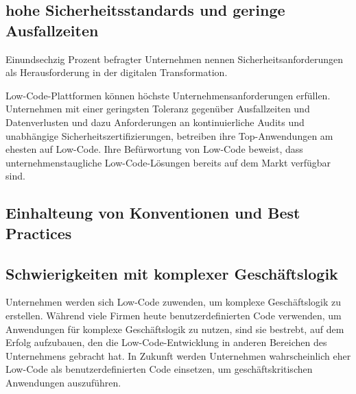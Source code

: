 \documentclass[12pt]{article} %
\begin{document}
	\subsection{hohe Sicherheitsstandards und geringe Ausfallzeiten} 
	Einundsechzig Prozent befragter Unternehmen nennen Sicherheitsanforderungen als Herausforderung in der digitalen Transformation. \cite{EmmaVanPelt.2019} %
	
	Low-Code-Plattformen können höchste Unternehmensanforderungen erfüllen. Unternehmen mit einer geringsten Toleranz gegenüber Ausfallzeiten und Datenverlusten und dazu Anforderungen an kontinuierliche Audits und unabhängige Sicherheitszertifizierungen, betreiben ihre Top-Anwendungen am ehesten auf Low-Code. Ihre Befürwortung von Low-Code beweist, dass unternehmenstaugliche Low-Code-Lösungen bereits auf dem Markt verfügbar sind. \cite{EmmaVanPelt.2019}
	
	
	
	
	
	\subsection{Einhalteung von Konventionen und Best Practices}
	
	\subsection{Schwierigkeiten mit komplexer Geschäftslogik}
	Unternehmen werden sich Low-Code zuwenden, um komplexe Geschäftslogik zu erstellen.
	Während viele Firmen heute benutzerdefinierten Code verwenden, um Anwendungen für komplexe
	Geschäftslogik zu nutzen, sind sie bestrebt, auf dem Erfolg aufzubauen, den die Low-Code-Entwicklung in anderen Bereichen des Unternehmens gebracht hat. In Zukunft werden Unternehmen wahrscheinlich eher Low-Code als benutzerdefinierten Code einsetzen, um geschäftskritischen Anwendungen auszuführen. \cite{EmmaVanPelt.2019}
	
\end{document}
